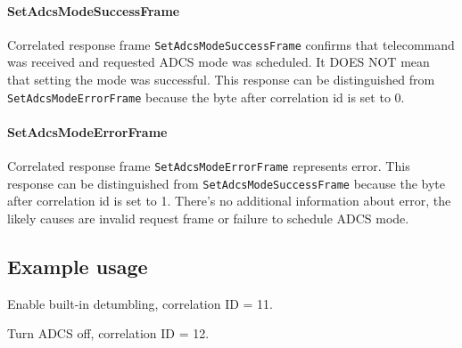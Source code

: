 \paragraph{SetAdcsModeSuccessFrame}
Correlated response frame \texttt{SetAdcsModeSuccessFrame} confirms that telecommand was received and requested ADCS mode was scheduled.  It DOES NOT mean that setting the mode was successful. This response can be distinguished from \texttt{SetAdcsModeErrorFrame} because the byte after correlation id is set to 0. 

\paragraph{SetAdcsModeErrorFrame}
Correlated response frame \texttt{SetAdcsModeErrorFrame} represents error. This response can be distinguished from \texttt{SetAdcsModeSuccessFrame} because the byte after correlation id is set to 1. There's no additional information about error, the likely causes are invalid request frame or failure to schedule ADCS mode.

\subsection{Example usage}
Enable built-in detumbling, correlation ID = 11.


Turn ADCS off, correlation ID = 12.

